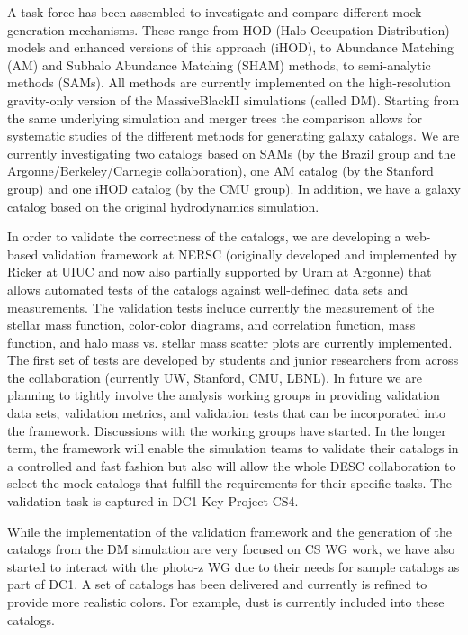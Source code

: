 A task force has been assembled to investigate and compare different mock generation mechanisms. These range from HOD (Halo Occupation Distribution) models and enhanced versions of this approach (iHOD), to Abundance Matching (AM) and Subhalo Abundance Matching  (SHAM) methods, to semi-analytic methods (SAMs). All methods are currently implemented on the high-resolution gravity-only version of the MassiveBlackII simulations (called DM). Starting from the same underlying simulation and merger trees the comparison allows for systematic studies of the different methods for generating galaxy catalogs. We are currently investigating two catalogs based on SAMs (by the Brazil group and the Argonne/Berkeley/Carnegie collaboration), one AM catalog (by the Stanford group) and one iHOD catalog (by the CMU group). In addition, we have a galaxy catalog based on the original hydrodynamics simulation.

In order to validate the correctness of the catalogs, we are developing a web-based validation framework at NERSC (originally developed and implemented by Ricker at UIUC and now also partially supported by Uram at Argonne) that allows automated tests of the catalogs against well-defined data sets and measurements. The validation tests include currently the measurement of the stellar mass function, color-color diagrams, and correlation function, mass function, and halo mass vs. stellar mass scatter plots are currently implemented. The first set of tests are developed by students and junior researchers from across the collaboration (currently UW, Stanford, CMU, LBNL). In future we are planning to tightly involve the analysis working groups in providing validation data sets, validation metrics, and validation tests that can be incorporated into the framework. Discussions with the working groups have started. In the longer term, the framework will enable the simulation teams to validate their catalogs in a controlled and fast fashion but also will allow the whole DESC collaboration to select the mock catalogs that fulfill the requirements for their specific tasks. The validation task is captured in DC1 Key Project CS4.

While the implementation of the validation framework and the generation of the catalogs from the DM simulation are very focused on CS WG work, we have also started to interact with the photo-z WG due to their needs for sample catalogs as part of DC1. A set of catalogs has been delivered and currently is refined to provide more realistic colors. For example, dust is currently included into these catalogs. 

